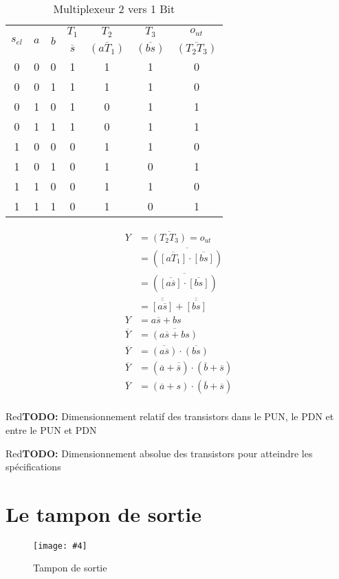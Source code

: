 \documentclass[a11paper]{article}
\newcommand{\todo}[1]{\begin{color}{Red}\textbf{TODO:} #1\end{color}}
\newcommand{\quicktab}[4]{
  \begin{table}[H]
    \centering
    \caption{#1}
    \label{tab:#2}
    \begin{tabular}{#3}
      #4
    \end{tabular}
  \end{table}
}
\newcommand{\quickfig}[4]{
\begin{figure}[H]
  \centering
  \texttt{[image: \#4]}
  \caption{#1}
  \label{fig:#2}
\end{figure}
}
\begin{document}
\begin{minipage}{0.48\textwidth}
\quicktab{Multiplexeur 2 vers 1 Bit}{mux2x1b}{ccccccc}{
  \toprule
  \multirow{2}{*}{$s_{el}$} &
  \multirow{2}{*}{$a$} &
  \multirow{2}{*}{$b$} &
  $T_1$ &
  $T_2$ &
  $T_3$ &
  $o_{ut}$ \\
  & & &
  $\overline{s}$ &
  $\overline{(aT_1)}$ &
  $\overline{(bs)}$ &
  $\overline{(T_2T_3)}$ \\
  \midrule
  0&0&0&1&1&1&0 \\
  0&0&1&1&1&1&0 \\
  0&1&0&1&0&1&1 \\
  0&1&1&1&0&1&1 \\
  1&0&0&0&1&1&0 \\
  1&0&1&0&1&0&1 \\
  1&1&0&0&1&1&0 \\
  1&1&1&0&1&0&1
  \\
  \bottomrule
}
\end{minipage}
\hfill
\begin{minipage}{0.48\textwidth}
\begin{align}
  Y &= \overline{(T_2T_3)} = o_{ut}  \\
  &= \overline{(\overline{[aT_1]}\cdot\overline{[bs]} )} \\
  &= \overline{(\overline{[a\overline{s}]}\cdot\overline{[bs]} )} \\
  &= \overline{\overline{[a\overline{s}]}} + \overline{\overline{[bs]}} \\
  Y &= a\overline{s} + bs \\
  \overline{Y} &= \overline{(a\overline{s} + bs)} \\
  \overline{Y} &= \overline{(a\overline{s})} \cdot \overline{(bs)} \\
  \overline{Y} &= (\overline{a}+\overline{\overline{s}}) \cdot (\overline{b}+\overline{s}) \\
  \overline{Y} &= (\overline{a}+s) \cdot (\overline{b}+\overline{s}) \\
\end{align}
\end{minipage}

\todo{Dimensionnement relatif des transistors dans le PUN, le PDN et entre le PUN et PDN}
\todo{Dimensionnement absolue des transistors pour atteindre les spécifications}

\newpage
\section{Le tampon de sortie}
\quickfig{Tampon de sortie}{pad_buffer}{.5}{assets/pad_buffer.png}
\end{document}
